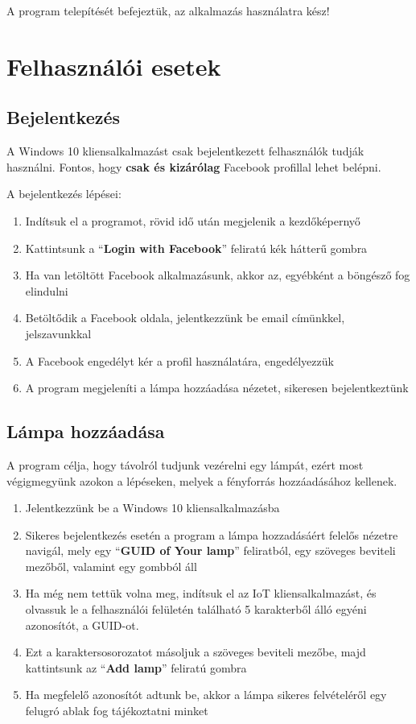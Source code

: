 \documentclass[a4paper,12pt]{report}
\begin{document}
    A program telepítését befejeztük, az alkalmazás használatra kész!

    \section{Felhasználói esetek}

    \subsection{Bejelentkezés}
    A Windows 10 kliensalkalmazást csak bejelentkezett felhasználók tudják használni. Fontos, hogy \textbf{csak és kizárólag}
    Facebook profillal lehet belépni.

    A bejelentkezés lépései:

    \begin{enumerate}
        \item Indítsuk el a programot, rövid idő után megjelenik a kezdőképernyő
        \item Kattintsunk a ``\textbf{Login with Facebook}'' feliratú kék hátterű gombra
        \item Ha van letöltött Facebook alkalmazásunk, akkor az, egyébként a böngésző fog elindulni
        \item Betöltődik a Facebook oldala, jelentkezzünk be email címünkkel, jelszavunkkal
        \item A Facebook engedélyt kér a profil használatára, engedélyezzük
        \item A program megjeleníti a lámpa hozzáadása nézetet, sikeresen bejelentkeztünk
    \end{enumerate}

    \subsection{Lámpa hozzáadása}
    A program célja, hogy távolról tudjunk vezérelni egy lámpát, ezért most végigmegyünk azokon a lépéseken, melyek a fényforrás
    hozzáadásához kellenek.

    \begin{enumerate}
        \item Jelentkezzünk be a Windows 10 kliensalkalmazásba
        \item Sikeres bejelentkezés esetén a program a lámpa hozzadásáért felelős nézetre navigál, mely egy ``\textbf{GUID of Your lamp}''
        feliratból, egy szöveges beviteli mezőből, valamint egy gombból áll
        \item Ha még nem tettük volna meg, indítsuk el az IoT kliensalkalmazást, és olvassuk le a felhasználói felületén található
        5 karakterből álló egyéni azonosítót, a GUID-ot.
        \item Ezt a karaktersosorozatot másoljuk a szöveges beviteli mezőbe, majd kattintsunk az ``\textbf{Add lamp}'' feliratú gombra
        \item Ha megfelelő azonosítót adtunk be, akkor a lámpa sikeres felvételéről egy felugró ablak fog tájékoztatni minket
    \end{enumerate}
\end{document}
